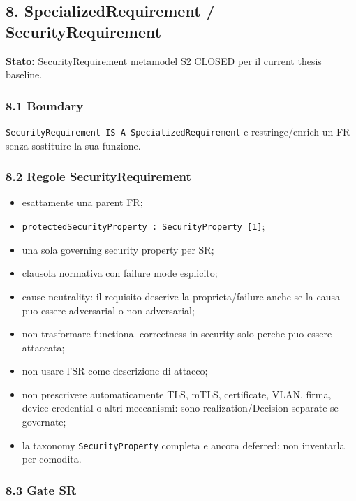 \documentclass[
  9pt,
  a4paper,
]{article}
\providecommand{\tightlist}{%
  \setlength{\itemsep}{0pt}\setlength{\parskip}{0pt}}
\begin{document}
\subsection{8. SpecializedRequirement /
SecurityRequirement}\label{specializedrequirement-securityrequirement}

\textbf{Stato:} SecurityRequirement metamodel S2 CLOSED per il current
thesis baseline.

\subsubsection{8.1 Boundary}\label{boundary}

\texttt{SecurityRequirement\ IS-A\ SpecializedRequirement} e
restringe/enrich un FR senza sostituire la sua funzione.

\subsubsection{8.2 Regole
SecurityRequirement}\label{regole-securityrequirement}

\begin{itemize}
\tightlist
\item
  esattamente una parent FR;
\item
  \texttt{protectedSecurityProperty\ :\ SecurityProperty\ {[}1{]}};
\item
  una sola governing security property per SR;
\item
  clausola normativa con failure mode esplicito;
\item
  cause neutrality: il requisito descrive la proprieta/failure anche se
  la causa puo essere adversarial o non-adversarial;
\item
  non trasformare functional correctness in security solo perche puo
  essere attaccata;
\item
  non usare l'SR come descrizione di attacco;
\item
  non prescrivere automaticamente TLS, mTLS, certificate, VLAN, firma,
  device credential o altri meccanismi: sono realization/Decision
  separate se governate;
\item
  la taxonomy \texttt{SecurityProperty} completa e ancora deferred; non
  inventarla per comodita.
\end{itemize}

\subsubsection{8.3 Gate SR}\label{gate-sr}
\end{document}
